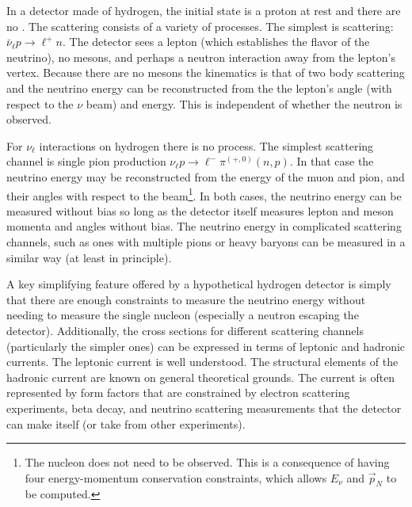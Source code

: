 
In a detector made of hydrogen, the initial state is a proton at rest and there are no . The scattering consists of a variety of processes. The simplest is  scattering: $\bar{\nu}_\ell p \to \ell^+ n$. The detector sees a lepton (which establishes the flavor of the neutrino), no mesons, and perhaps a neutron interaction away from the lepton's vertex. Because there are no mesons the kinematics is that of two body scattering and the neutrino energy can be reconstructed from the the lepton's angle (with respect to the $\nu$ beam) and energy. This is independent of whether the neutron is observed.

For $\nu_\ell$ interactions on hydrogen there is no  process. The simplest scattering channel is single pion production $\nu_\ell p \to \ell^- \pi^{(+,0)} (n,p)$. In that case the neutrino energy may be reconstructed from the energy of the muon and pion, and their angles with respect to the beam\footnote{The nucleon does not need to be observed. This is a consequence of having four energy-momentum conservation constraints, which allows $E_\nu$ and $\vec{p}_N$ to be computed.}. In both cases, the neutrino energy can be measured without bias so long as the detector itself measures lepton and meson momenta and angles without bias.  The neutrino energy in complicated scattering channels, such as ones with multiple pions or heavy baryons can be measured in a similar way (at least in principle).

A key simplifying feature offered by a hypothetical hydrogen detector is simply that there are enough constraints to measure the neutrino energy without needing to measure the single nucleon (especially a neutron escaping the detector). Additionally, the cross sections for different scattering channels (particularly the simpler ones) can be expressed in terms of leptonic and hadronic currents. The leptonic current is well understood. The structural elements of the hadronic current are known on general theoretical grounds. The current is often represented by form factors that are constrained by electron scattering experiments, beta decay, and neutrino scattering measurements that the detector can make itself (or take from other experiments). 



